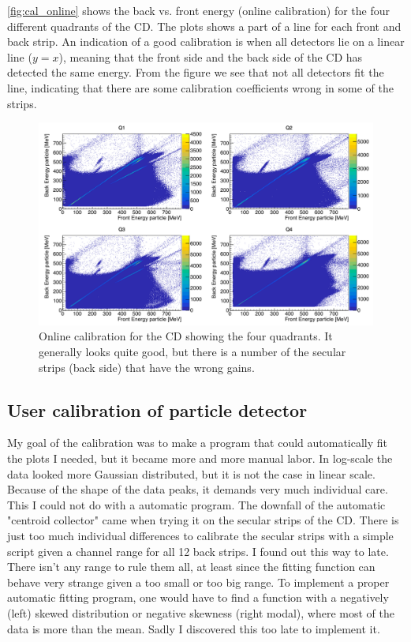\documentclass[twoside,english]{uiofysmaster/uiofysmaster}
\begin{document}
\autoref{fig:cal_online} shows the back vs. front energy (online calibration) for the four different quadrants of the CD. 
The plots shows a part of a line for each front and back strip. An indication of a good calibration is when all detectors lie on a linear line ($y = x$), meaning that the front side and the back side of the CD has detected the same energy. 
From the figure we see that not all detectors fit the line, indicating that there are some calibration coefficients wrong in some of the strips.

\begin{figure}[ht]
	\centering
	\includegraphics[width=\textwidth]{../Plots/plotting/E_f_b_Q1-4-online.png}
	\caption{Online calibration for the CD showing the four quadrants. It generally looks quite good, but there is a number of the secular strips (back side) that have the wrong gains.}
	\label{fig:cal_online}
\end{figure}










\subsection{User calibration of particle detector}


My goal of the calibration was to make a program that could automatically fit the plots I needed, but it became more and more manual labor. 
In log-scale the data looked more Gaussian distributed, but it is not the case in linear scale. 
Because of the shape of the data peaks, it demands very much individual care. 
This I could not do with a automatic program. 
The downfall of the automatic "centroid collector" came when trying it on the secular strips of the CD. 
There is just too much individual differences to calibrate the secular strips with a simple script given a channel range for all 12 back strips. 
I found out this way to late. 
There isn't any range to rule them all, at least since the fitting function can behave very strange given a too small or too big range.
To implement a proper automatic fitting program, one would have to find a function with a negatively (left) skewed distribution or negative skewness (right modal), where most of the data is more than the mean. Sadly I discovered this too late to implement it. 
\end{document}
